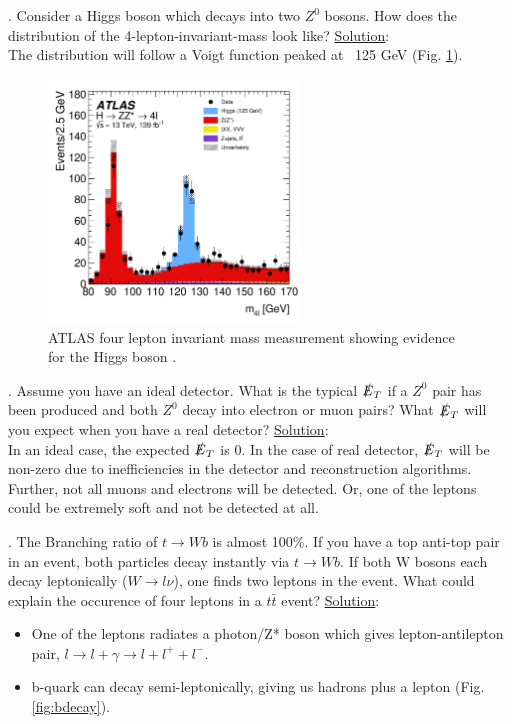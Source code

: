\documentclass[a4paper]{report}
\numberwithin{equation}{section}
\begin{document}
\bigbreak

. Consider a Higgs boson which decays into two $Z^0$ bosons. How does the distribution of the 4-lepton-invariant-mass look like?
\bigbreak
\noindent \underline{Solution}: \\
\noindent The distribution will follow a Voigt function peaked at ~125 GeV (Fig. \ref{fig:higgs-decay}).

\begin{figure}[htpb]
    \centering
    \includegraphics[width=0.6\textwidth]{higgs-decay}
    \caption{ATLAS four lepton invariant mass measurement showing evidence for the Higgs boson \cite{ATLAS:2020wny}.}
    \label{fig:higgs-decay}
\end{figure}

\bigbreak

. Assume you have an ideal detector. What is the typical $\slashed{E}_T$ if a $Z^0$ pair has been produced and both $Z^0$ decay into electron or muon pairs? What $\slashed{E}_T$ will you expect when you have a real detector?
\bigbreak
\noindent \underline{Solution}: \\
\noindent In an ideal case, the expected $\slashed{E}_T$ is 0. In the case of real detector, $\slashed{E}_T$ will be non-zero due to inefficiencies in the detector and reconstruction algorithms. Further, not all muons and electrons will be detected. Or, one of the leptons could be extremely soft and not be detected at all. 

\bigbreak

. The Branching ratio of $t \rightarrow W b$ is almost 100\%. If you have a top anti-top pair in an event, both particles decay instantly via $t \rightarrow W b$. If both W bosons each decay leptonically ($W \rightarrow l \nu$), one finds two leptons in the event. What could explain the occurence of four leptons in a $t \bar{t}$ event?
\bigbreak
\noindent \underline{Solution}: \\
\begin{itemize}
	\item One of the leptons radiates a photon/Z* boson which gives lepton-antilepton pair, $l \rightarrow l + \gamma \rightarrow l + l^+ + l^-$.
	\item b-quark can decay semi-leptonically, giving us hadrons plus a lepton (Fig. \ref{fig:bdecay}).
\end{itemize}
\end{document}
